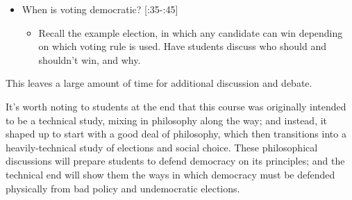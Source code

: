 \begin{itemize}
    \item When is voting democratic? [:35-:45]
    \begin{itemize}
%
%
%
%

        \item Recall the example election, in which any candidate can win depending on which voting rule is used.  Have students discuss who should and shouldn't win, and why.

    \end{itemize}

\end{itemize}

This leaves a large amount of time for additional discussion and debate.

It's worth noting to students at the end that this course was originally intended to be a technical study, mixing in philosophy along the way; and instead, it shaped up to start with a good deal of philosophy, which then transitions into a heavily-technical study of elections and social choice.  These philosophical discussions will prepare students to defend democracy on its principles; and the technical end will show them the ways in which democracy must be defended physically from bad policy and undemocratic elections.

